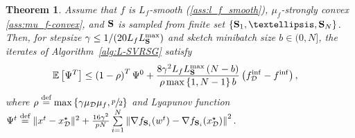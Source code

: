 \documentclass{article}
\newcommand{\cD}{\mathcal{D}}
\newcommand{\eqdef}{\stackrel{\text{def}}{=}}
\newtheorem{theorem}{Theorem}
\theoremstyle{plain}
\newcommand{\tf}{f_{\mathcal{D}}}
\newcommand{\mS}{{\bf S}}
\theoremstyle{plain}
\theoremstyle{definition}
\theoremstyle{remark}
\begin{document}
\begin{theorem}
\label{thm:strong-lsvrg}
Assume that $f$ is $L_f$-smooth (\ref{ass:l_f_smooth}), $\mu_f$-strongly convex \eqref{ass:mu_f-convex}, and $\mS$ is sampled from finite set $\{\mS_1,\ldots, \mS_{N}\}$.
Then, for stepsize $\gamma \leq 1/(20 L_f L_{\mS}^{\max})$ and sketch minibatch size $b \in (0, N]$, the iterates of Algorithm~\ref{alg:L-SVRSG} satisfy
  	\begin{equation*}
	\begin{split}
		\mathbb{E} \left[\Psi^{T}\right]&\leq \left(1 - \rho \right)^T\Psi^0  + \frac{8\gamma^2L_fL_{\mS}^{\max}\left(N - b\right) }{\rho  \max\left\lbrace  1, N - 1\right\rbrace b} \left(\tf^{\inf}- f^{\inf}\right),
	\end{split}
    \end{equation*}
    where $\rho \eqdef \max\left\lbrace\gamma \mu_{\mathcal{D}} \mu_f, \sfrac{p}{2}\right\rbrace$ and Lyapunov function $\Psi^t \eqdef \|x^t - x_\cD^\star\|^2 + \frac{16 \gamma^2}{pN} \sum\limits^{N}_{i = 1}\left\|\nabla f_{\mS_i}(w^t) - \nabla f_{\mS_i}(x_\cD^\star)\right\|^2.$
\end{theorem}
\end{document}
